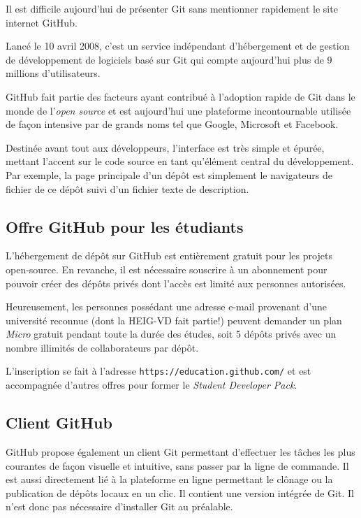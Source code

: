 \documentclass[11pt,a4paper]{article}
\begin{document}
Il est difficile aujourd'hui de présenter Git sans mentionner rapidement le site internet GitHub.

Lancé le 10 avril 2008, c'est un service indépendant d'hébergement et de gestion de développement de logiciels basé sur Git qui compte aujourd'hui plus de 9 millions d'utilisateurs.

GitHub fait partie des facteurs ayant contribué à l'adoption rapide de Git dans le monde de l'\textit{open source} et est aujourd'hui une plateforme incontournable utilisée de façon intensive par de grands noms tel que Google, Microsoft et Facebook. 

Destinée avant tout aux développeurs, l'interface est très simple et épurée, mettant l'accent sur le code source en tant qu'élément central du développement. Par exemple, la page principale d'un dépôt est simplement le navigateurs de fichier de ce dépôt suivi d'un fichier texte de description.

\subsection{Offre GitHub pour les étudiants}

L'hébergement de dépôt sur GitHub est entièrement gratuit pour les projets open-source.
En revanche, il est nécessaire souscrire à un abonnement pour pouvoir créer des dépôts privés dont l'accès est limité aux personnes autorisées.

Heureusement, les personnes possédant une adresse e-mail provenant d'une université reconnue (dont la HEIG-VD fait partie!) peuvent demander un plan \textit{Micro} gratuit pendant toute la durée des études, soit 5 dépôts privés avec un nombre illimités de collaborateurs par dépôt.

L'inscription se fait à l'adresse {\tt https://education.github.com/} et est accompagnée d'autres offres pour former le {\it Student Developer Pack}.

\subsection{Client GitHub}

GitHub propose également un client Git permettant d'effectuer les tâches les plus courantes de façon visuelle et intuitive, sans passer par la ligne de commande.
Il est aussi directement lié à la plateforme en ligne permettant le clônage ou la publication de dépôts locaux en un clic.
Il contient une version intégrée de Git. Il n'est donc pas nécessaire d'installer Git au préalable.
\end{document}
